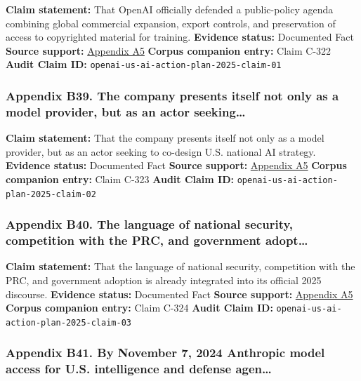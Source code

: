 \documentclass[
  american,
  11pt,
  letterpaper,
]{article}
\begin{document}
\textbf{Claim statement:} That OpenAI officially defended a
public-policy agenda combining global commercial expansion, export
controls, and preservation of access to copyrighted material for
training. \textbf{Evidence status:} Documented Fact \textbf{Source
support:}
\hyperref[appendix-a5-openais-proposals-for-the-us-ai-action-plan]{Appendix
A5} \textbf{Corpus companion entry:} Claim C-322 \textbf{Audit Claim
ID:} \texttt{openai-us-ai-action-plan-2025-claim-01}

\subsubsection{Appendix B39. The company presents itself not only as a
model provider, but as an actor
seeking\ldots{}}\label{appendix-b39-the-company-presents-itself-not-only-as-a-model-provider-but-as-an-actor-seeking}

\textbf{Claim statement:} That the company presents itself not only as a
model provider, but as an actor seeking to co-design U.S. national AI
strategy. \textbf{Evidence status:} Documented Fact \textbf{Source
support:}
\hyperref[appendix-a5-openais-proposals-for-the-us-ai-action-plan]{Appendix
A5} \textbf{Corpus companion entry:} Claim C-323 \textbf{Audit Claim
ID:} \texttt{openai-us-ai-action-plan-2025-claim-02}

\subsubsection{Appendix B40. The language of national security,
competition with the PRC, and government
adopt\ldots{}}\label{appendix-b40-the-language-of-national-security-competition-with-the-prc-and-government-adopt}

\textbf{Claim statement:} That the language of national security,
competition with the PRC, and government adoption is already integrated
into its official 2025 discourse. \textbf{Evidence status:} Documented
Fact \textbf{Source support:}
\hyperref[appendix-a5-openais-proposals-for-the-us-ai-action-plan]{Appendix
A5} \textbf{Corpus companion entry:} Claim C-324 \textbf{Audit Claim
ID:} \texttt{openai-us-ai-action-plan-2025-claim-03}

\subsubsection{Appendix B41. By November 7, 2024 Anthropic model access
for U.S. intelligence and defense
agen\ldots{}}\label{appendix-b41-by-november-7-2024-anthropic-model-access-for-u-s-intelligence-and-defense-agen}
\end{document}
